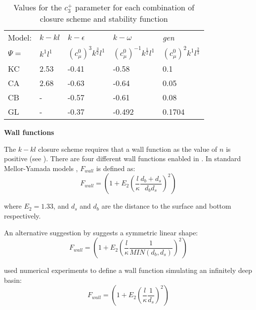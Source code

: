 \begin{table}[b]
\begin{center}
\begin{tabular}{lllll}\hline
Model: & $k-kl$   & $k-\epsilon$                  & $k-\omega$                       & \emph{gen}       \\
$\Psi=$& $k^1l^1$ & $\left(c_\mu^0\right)^3k^\frac{3}{2}l^1$ & $\left(c_\mu^0\right)^{-1}k^\frac{1}{2}l^1$ & $\left(c_\mu^0\right)^2k^1l^\frac{2}{3}$  \\ \hline
KC                   & 2.53            & -0.41          & -0.58         & 0.1         \\
CA                   & 2.68            & -0.63          & -0.64         & 0.05        \\
CB                   &  -              & -0.57          & -0.61         & 0.08        \\
GL                   &  -              & -0.37          & -0.492        & 0.1704      \\
\end{tabular}
\end{center}
\caption{Values for the $c_3^+$ parameter for each combination of closure scheme and stability function}
\label{tab:c3minus}
\end{table}


\par{\textbf{Wall functions}\\}
\label{sec:wall_functions}

The $k-kl$ closure scheme requires that a wall function as the value of $n$ is positive (see \citet{umlauf2003}). There
are four different wall functions enabled in \fluidity. In standard Mellor-Yamada models \citep{mellor1982}, $F_{wall}$ is defined as:
\begin{equation}
F_{wall} = \left(1+E_2 \left(\frac{l}{\kappa} \frac{d_b + d_s}{d_b d_s}\right)^2\right)
\end{equation}

\noindent
where $E_2=1.33$, and $d_s$ and $d_b$ are the distance to the surface and bottom respectively.

An alternative suggestion by \citet{burchard1998} suggests a symmetric linear shape:
\begin{equation}
F_{wall} = \left(1+E_2 \left(\frac{l}{\kappa} \frac{1}{MIN\left(d_b,d_s\right)}\right)^2\right)
\end{equation}

\citet{burchard2001} used numerical experiments to define a wall function simulating an infinitely deep
basin:
\begin{equation}
F_{wall} = \left(1+E_2 \left(\frac{l}{\kappa} \frac{1}{d_s}\right)^2\right)
\end{equation}

